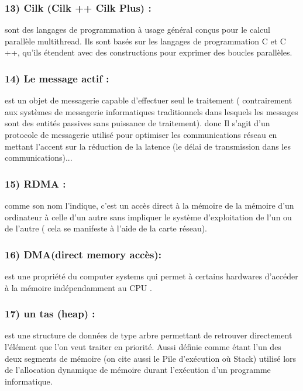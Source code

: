 \documentclass[12pt,titlepage]{report}
\begin{document}
\subsubsection{13) Cilk (Cilk ++ Cilk Plus) :}sont des langages de programmation à usage général conçus pour le calcul parallèle multithread. Ils sont basés sur les langages de programmation C et C ++, qu'ils étendent avec des constructions pour exprimer des boucles parallèles.\\

\subsubsection{14) Le message actif :}est un objet de messagerie capable d'effectuer seul le traitement ( contrairement aux systèmes de messagerie informatiques traditionnels dans lesquels les messages sont des entités passives sans puissance de traitement). donc Il s'agit d'un protocole de messagerie utilisé pour optimiser les communications réseau en mettant l'accent sur la réduction de la latence (le délai de transmission dans les communications)...\\
\subsubsection{15) RDMA : }comme son nom l’indique, c’est un accès direct à la mémoire de la mémoire d'un ordinateur à celle d'un autre sans impliquer le système d'exploitation de l'un ou de l'autre ( cela se manifeste à l’aide de la carte réseau).\\
\subsubsection{16) DMA(direct memory accès):} est une propriété du computer systems qui permet à certains hardwares d’accéder à la mémoire indépendamment au CPU .\\

\subsubsection{17) un tas (heap) :}est une structure de données de type arbre permettant de retrouver directement l'élément que l'on veut traiter en priorité. Aussi définie comme étant l’un des deux segments de mémoire (on cite aussi le Pile d’exécution où Stack) utilisé lors de l'allocation dynamique de mémoire durant l'exécution d'un programme informatique. \\
\end{document}
